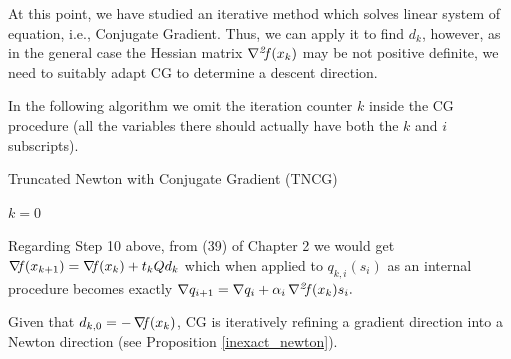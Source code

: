 \documentclass[10pt,a4paper]{article}
\begin{document}
At this point, we have studied an iterative method which solves linear system of equation, i.e., Conjugate Gradient. Thus, we can apply it to find $d_k$, however, as in the general case the Hessian matrix $\operatorname*{\mathit{\nabla^2 \!f}}(x_k)$ may be not positive definite, we need to suitably adapt CG to determine a descent direction.

In the following algorithm we omit the iteration counter $k$ inside the CG procedure (all the variables there should actually have both the $k$ and $i$ subscripts).\\
\begin{algorithm}[H]\label{alg:tncg}
\caption{Truncated Newton with Conjugate Gradient (TNCG)}


$k=0$

\end{algorithm}
\noindent Regarding Step 10 above, from (39) of Chapter 2 we would get 
$\operatorname*{\mathit{\nabla \!f}}(x_{k+1}) = \operatorname*{\mathit{\nabla \!f}}(x_k) +t_k Q d_k$ which when applied to $q_{k,i}(s_i)$ as an internal procedure becomes exactly $\nabla q_{i+1} = \nabla q_i + \alpha_i \operatorname*{\mathit{\nabla^2 \!f}}(x_k) s_i.$
\par Given that $d_{k,0}=-\operatorname*{\mathit{\nabla \!f}}(x_k)$, CG is iteratively refining a gradient direction into a Newton direction (see Proposition \ref{inexact_newton}).
\end{document}
